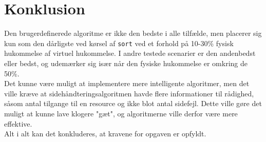 \section{Konklusion}
Den brugerdefinerede algoritme er ikke den bedste i alle tilfælde, men placerer sig kun som den dårligste ved kørsel af \texttt{sort} ved et forhold på 10-30\% fysisk hukommelse af virtuel hukommelse. I andre testede scenarier er den andenbedst eller bedst, og udemærker sig især når den fysiske hukommelse er omkring de 50\%.\\

Det kunne være muligt at implementere mere intelligente algoritmer, men det ville kræve at sidehåndteringsalgoritmen havde flere informationer til rådighed, såsom antal tilgange til en resource og ikke blot antal sidefejl. Dette ville gøre det muligt at kunne lave klogere "gæt", og algoritmerne ville derfor være mere effektive.\\

Alt i alt kan det konkluderes, at kravene for opgaven er opfyldt.